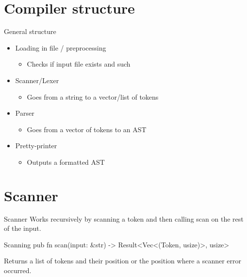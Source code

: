\documentclass[10pt]{beamer}
\begin{document}
\section{Compiler structure}
\begin{frame}{General structure}
    \begin{itemize}
        \item Loading in file / preprocessing
            \begin{itemize}
                \item Checks if input file exists and such
            \end{itemize}
        \item Scanner/Lexer
        \begin{itemize}
            \item Goes from a string to a vector/list of tokens
        \end{itemize}
        \item Parser
        \begin{itemize}
            \item Goes from a vector of tokens to an AST
        \end{itemize}
        \item Pretty-printer
        \begin{itemize}
            \item Outputs a formatted AST
        \end{itemize}
    \end{itemize}
\end{frame}

\section{Scanner}
\begin{frame}{Scanner}
    Works recursively by scanning a token and then calling scan on the rest of the input.

    \begin{block}{Scanning}
        pub fn scan(input: \&str) -> Result<Vec<(Token, usize)>, usize>
      \end{block}
    Returns a list of tokens and their position or the position where a scanner error occurred.
\end{frame}
\end{document}

